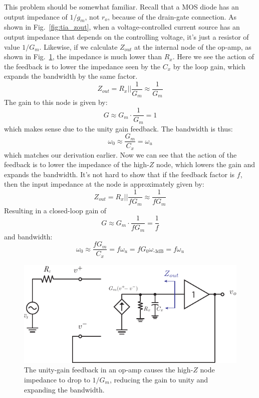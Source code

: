 This problem should be somewhat familiar.  Recall that a MOS diode has an output impedance of $1/g_m$, not $r_o$, because of the drain-gate connection.  As shown in Fig.~\ref{fig:tia_zout}, when a voltage-controlled current source has an output impedance that depends on the controlling voltage, it's just a resistor of value $1/G_m$.  Likewise, if we calculate $Z_{out}$ at the internal node of the op-amp, as shown in Fig.~\ref{fig:opamp_model_fb_unity_label}, the impedance is much lower than $R_x$.   Here we see the action of the feedback is to lower the impedance seen by the $C_x$ by the loop gain, which expands the bandwidth by the same factor.
\begin{equation}
	Z_{out} = R_x || \frac{1}{G_m} \approx \frac{1}{G_m}
\end{equation}
The gain to this node is given by:
\begin{equation}
	G \approx G_m \cdot \frac{1}{G_m} = 1
\end{equation}
which makes sense due to the unity gain feedback.  The bandwidth is thus:
\begin{equation}
	\omega_0 \approx \frac{G_m}{C_x } = \omega_u
\end{equation}
which matches our derivation earlier.  Now we can see that the action of the feedback is to lower the impedance of the high-$Z$ node, which lowers the gain and expands the bandwidth. It's not hard to show that if the feedback factor is $f$, then the input impedance at the node is approximately given by:
\begin{equation}
	Z_{out} = R_x || \frac{1}{f G_m} \approx \frac{1}{f G_m}
\end{equation}
Resulting in a closed-loop gain of 
\begin{equation}
	G \approx G_m \cdot \frac{1}{f G_m} = \frac{1}{f}
\end{equation}
and bandwidth:
\begin{equation}
	\omega_0 \approx \frac{f G_m}{C_x } = f \omega_u  = f G_0 \omega_{\text{-3dB}} = f \omega_u  
\end{equation}
\begin{figure}[tb]
\begin{center}
\includegraphics[scale=1]{opamp_model_fb_unity_label}
\end{center}
\caption{The unity-gain feedback in an op-amp causes the high-$Z$ node impedance to drop to $1/G_m$, reducing the gain to unity and expanding the bandwidth.}
\label{fig:opamp_model_fb_unity_label}
\end{figure}
